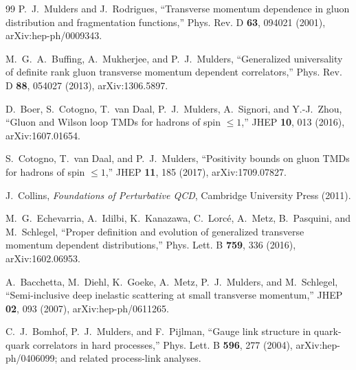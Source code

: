 \documentclass[11pt]{article}
\begin{document}
\begin{thebibliography}{99}
P.~J.~Mulders and J.~Rodrigues,
``Transverse momentum dependence in gluon distribution and fragmentation
functions,''
Phys. Rev. D \textbf{63}, 094021 (2001),
arXiv:hep-ph/0009343.

M.~G.~A.~Buffing, A.~Mukherjee, and P.~J.~Mulders,
``Generalized universality of definite rank gluon transverse momentum
dependent correlators,''
Phys. Rev. D \textbf{88}, 054027 (2013),
arXiv:1306.5897.

D.~Boer, S.~Cotogno, T.~van Daal, P.~J.~Mulders, A.~Signori, and
Y.-J.~Zhou,
``Gluon and Wilson loop TMDs for hadrons of spin \(\le1\),''
JHEP \textbf{10}, 013 (2016),
arXiv:1607.01654.

S.~Cotogno, T.~van Daal, and P.~J.~Mulders,
``Positivity bounds on gluon TMDs for hadrons of spin \(\le1\),''
JHEP \textbf{11}, 185 (2017),
arXiv:1709.07827.

J.~Collins,
\emph{Foundations of Perturbative QCD},
Cambridge University Press (2011).

M.~G.~Echevarria, A.~Idilbi, K.~Kanazawa, C.~Lorc\'e, A.~Metz,
B.~Pasquini, and M.~Schlegel,
``Proper definition and evolution of generalized transverse momentum
dependent distributions,''
Phys. Lett. B \textbf{759}, 336 (2016),
arXiv:1602.06953.

A.~Bacchetta, M.~Diehl, K.~Goeke, A.~Metz, P.~J.~Mulders, and M.~Schlegel,
``Semi-inclusive deep inelastic scattering at small transverse momentum,''
JHEP \textbf{02}, 093 (2007),
arXiv:hep-ph/0611265.

C.~J.~Bomhof, P.~J.~Mulders, and F.~Pijlman,
``Gauge link structure in quark-quark correlators in hard processes,''
Phys. Lett. B \textbf{596}, 277 (2004),
arXiv:hep-ph/0406099;
and related process-link analyses.

\end{thebibliography}
\end{document}
